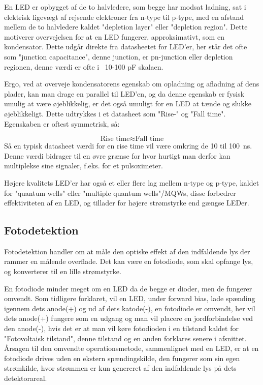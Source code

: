 \begin{itemize}
    En LED er opbygget af de to halvledere, som begge har modsat ladning, sat i elektrisk ligevægt af rejsende elektroner fra n-type til p-type, med en afstand mellem de to halvledere kaldet "depletion layer" eller "depletion region". Dette motiverer overvejelsen for at en LED fungerer, approksimativt, som en kondensator. Dette udgår direkte fra datasheetet for LED'er, her står det ofte som "junction capacitance", denne junction, er pn-junction eller depletion regionen, denne værdi er ofte i ~10-100 pF skalaen.
    
    Ergo, ved at overveje kondensatorens egenskab om opladning og afladning af dens plader, kan man drage en parallel til LED'en, og da denne egenskab er fysisk umulig at være øjeblikkelig, er det også umuligt for en LED at tænde og slukke øjeblikkeligt. Dette udtrykkes i et datasheet som "Rise-" og "Fall time". Egenskaben er oftest symmetrisk, så:

    $$
    \text{Rise time} \approx \text{Fall time}    
    $$
    Så en typisk datasheet værdi for en rise time vil være omkring de 10 til \SI{100}{ns}. Denne værdi bidrager til en øvre grænse for hvor hurtigt man derfor kan multiplekse sine signaler, f.eks. for et pulsoximeter.
\end{itemize}

Højere kvalitets LED'er har også et eller flere lag mellem n-type og p-type, kaldet for "quantum wells" eller "multiple quantum wells"/MQWs, disse forbedrer effektiviteten af en LED, og tillader for højere strømstyrke end gængse LEDer.

        
    \subsection{Fotodetektion}

Fotodetektion handler om at måle den optiske effekt af den indfaldende lys der rammer en målende overflade. Det kan være en fotodiode, som skal opfange lys, og konverterer til en lille strømstyrke.

En fotodiode minder meget om en LED da de begge er dioder, men de fungerer omvendt. Som tidligere forklaret, vil en LED, under forward bias, lade spænding igennem dets anode(+) og ud af dets katode(-), en fotodiode er omvendt, her vil dets anode(+) fungere som en udgang og man vil placere en jordforbindelse ved den anode(-), hvis det er at man vil køre fotodioden i en tilstand kaldet for "Fotovoltaisk tilstand", denne tilstand og en anden forklares senere i afsnittet. Årsagen til den omvendte operationsmetode, sammenlignet med en LED, er at en fotodiode drives uden en ekstern spændingskilde, den fungerer som sin egen strømkilde, hvor strømmen er kun genereret af den indfaldende lys på dets detektorareal. 

